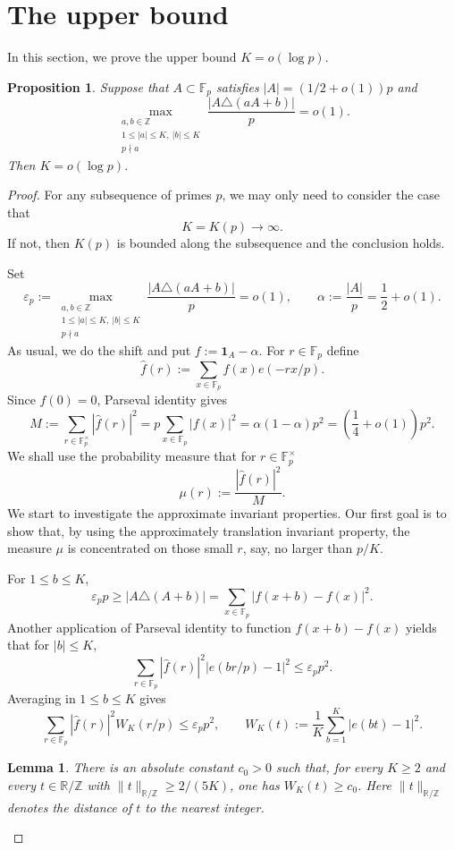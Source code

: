 \documentclass[11pt,letterpaper,reqno]{amsart}
\newtheorem{lemma}[theorem]{Lemma}
\newtheorem{proposition}[theorem]{Proposition}
\theoremstyle{definition}
\newcommand{\F}{\mathbb F}
\newcommand{\Z}{\mathbb Z}
\newcommand{\R}{\mathbb R}
\newcommand{\1}{\mathbf 1}
\newcommand{\eps}{\varepsilon}
\begin{document}
\section{The upper bound}\label{sec:upper}

In this section, we prove the upper bound $K=o(\log p)$.

\begin{proposition}\label{prop:upper}
Suppose that $A\subset\F_p$ satisfies $|A|=(1/2+o(1))p$ and
\[
        \max_{\substack{a,b\in\Z\\ 1\le |a|\le K,\ |b|\le K\\ p\nmid a}}
        \frac{|A\triangle(aA+b)|}{p}=o(1).
\]
Then $K=o(\log p)$.
\end{proposition}

\begin{proof}
For any subsequence of primes $p$, 
we may only need to consider the case that $$K = K(p)\to \infty. $$ If not, then $K(p)$ is bounded along the subsequence and the conclusion holds. 

Set
\[
    \eps_p:=
    \max_{\substack{a,b\in\Z\\ 1\le |a|\le K,\ |b|\le K\\ p\nmid a}}
        \frac{|A\triangle(aA+b)|}{p}=o(1),
    \qquad
    \alpha:=\frac{|A|}{p}=\frac12+o(1).
\]
As usual, we do the shift and put $f:=\1_A-\alpha$.  For $r\in\F_p$ define
\[
    \widehat f(r):=\sum_{x\in\F_p} f(x)e(-rx/p).
\]
Since $\widehat f(0)=0$, Parseval identity gives
\[
M:=\sum_{r\in\F_p^\times}|\widehat f(r)|^2 =p\sum_{x\in\F_p}|f(x)|^2
      =\alpha(1-\alpha)p^2
=\left(\frac14+o(1)\right)p^2.
\]
We shall use the probability measure that for $r\in\F_p^\times$
\[
    \mu(r):=\frac{|\widehat f(r)|^2}{M}.
\]
We start to investigate the approximate invariant properties. Our first goal is to show that, by using the approximately translation invariant property, the measure $\mu$ is concentrated on those small $r$, say, no larger than $p/K$. 

For $1\le b\le K$,
\[
    \eps_p p \ge |A\triangle(A+b)|  =  \sum_{x\in\F_p}|f(x+b)-f(x)|^2.
\]
Another application of Parseval identity to function $f(x+b)-f(x)$ yields that for $|b|\le K$, 
\[\sum_{r\in\F_p} |\widehat f(r)|^2|e(br/p)-1|^2\le \eps_p p^2.
\]
Averaging in $1\le b\le K$ gives
\[\sum_{r\in\F_p} |\widehat f(r)|^2 W_K(r/p)\le \eps_p p^2,
    \qquad
    W_K(t):=\frac1K\sum_{b=1}^K |e(bt)-1|^2.
\]

\begin{lemma}\label{lem:WK}
There is an absolute constant $c_0>0$ such that, for every $K\ge2$ and every
$t\in\R/\Z$ with $\|t\|_{\R/\Z}\ge 2/(5K)$, one has $W_K(t)\ge c_0$. Here $\|t\|_{\R/\Z}$ denotes the distance of $t$ to the nearest integer.
\end{lemma}


\end{proof}
\end{document}

